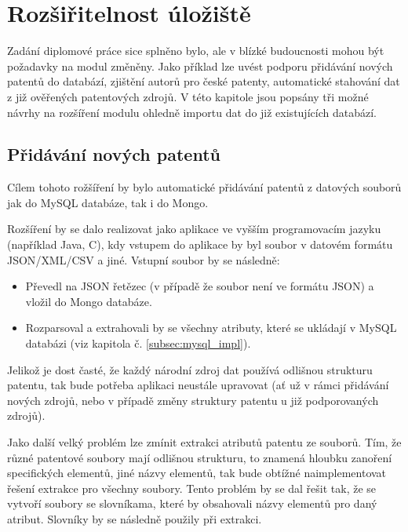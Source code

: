 \chapter{Rozšiřitelnost úložiště}
Zadání diplomové práce sice splněno bylo, ale v blízké budoucnosti mohou být požadavky na modul změněny. Jako příklad lze uvést podporu přidávání nových patentů do databází, zjištění autorů pro české patenty, automatické stahování dat z již ověřených patentových zdrojů. V této kapitole jsou popsány tři možné návrhy na rozšíření modulu ohledně importu dat do již existujících databází.

\section{Přidávání nových patentů} \label{sec:new_patenty}
Cílem tohoto rožšíření by bylo automatické přidávání patentů z datových souborů jak do MySQL databáze, tak i do Mongo.

Rozšíření by se dalo realizovat jako aplikace ve vyšším programovacím jazyku (například Java, C), kdy vstupem do aplikace by byl soubor v datovém formátu \gls{JSON}/\gls{XML}/\gls{CSV} a jiné. Vstupní soubor by se následně:
\begin{itemize}
\item Převedl na \gls{JSON} řetězec (v případě že soubor není ve formátu \gls{JSON}) a vložil do Mongo databáze.
\item Rozparsoval a extrahovali by se všechny atributy, které se ukládají v MySQL databázi (viz kapitola č. \ref{subsec:mysql_impl}).\newline
\end{itemize}

\noindent Jelikož je dost časté, že každý národní zdroj dat používá odlišnou strukturu patentu, tak bude potřeba aplikaci neustále upravovat (ať už v rámci přidávání nových zdrojů, nebo v případě změny struktury patentu u již podporovaných zdrojů).

Jako další velký problém lze zmínit extrakci atributů patentu ze souborů. Tím, že různé patentové soubory mají odlišnou strukturu, to znamená hloubku zanoření specifických elementů, jiné názvy elementů, tak bude obtížné naimplementovat řešení extrakce pro všechny soubory. Tento problém by se dal řešit tak, že se vytvoří soubory se slovníkama, které by obsahovali názvy elementů pro daný atribut. Slovníky by se následně použily při extrakci.

